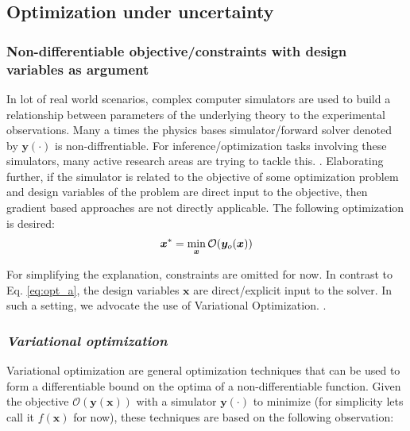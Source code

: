 \begin{itemize}
\clearpage

\subsection{Optimization under uncertainty}






\subsubsection{Non-differentiable objective/constraints with design variables as argument}
%
In lot of real world scenarios, complex computer simulators are used to build a relationship between parameters of the underlying theory to the experimental observations. Many a times the physics bases simulator/forward solver denoted by $\bm{y}(\cdot)$ is non-diffrentiable. For inference/optimization tasks involving these simulators, many active research areas are trying to tackle this. \cite{cranmer2020frontier, louppe_adversarial_2019, beaumont2002approximate,marjoram2003markov}. Elaborating further, if the simulator is related to the objective of some optimization problem and design variables of the problem are direct input to the objective, then gradient based approaches are not directly applicable. The following optimization is desired:
\begin{align}
	\bm{x}^* = \min_{\bm{x}}\mathcal{O}(\boldsymbol{y}_o(\bm{x}))
\end{align}

For simplifying the explanation, constraints are omitted for now. In contrast to Eq. \ref{eq:opt_a}, the design variables $\bm{x}$ are direct/explicit input to the solver. In such a setting, we advocate the use of Variational Optimization. \cite{bird_stochastic_2018,staines_variational_2012,staines2013optimization}. 

\subsubsection{\emph{Variational optimization}}

Variational optimization are general optimization techniques that can be used to form a differentiable bound on the optima of a non-differentiable function. Given the objective $\mathcal{O}(\bm{y}(\bm{x}))$ with a simulator $\bm{y}(\cdot)$ to minimize (for simplicity lets call it $f(\bm{x})$ for now), these techniques are based on the following observation:


\end{itemize}
